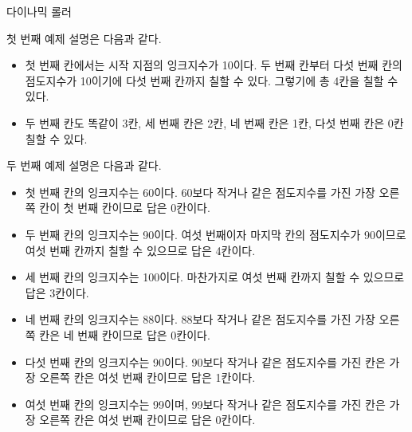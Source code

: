 \begin{problem}{다이나믹 롤러}
    \Examples
    
    \begin{example}
    \end{example}
    
    \Explanation
    첫 번째 예제 설명은 다음과 같다.
    \begin{itemize}
        \item 첫 번째 칸에서는 시작 지점의 잉크지수가 10이다. 두 번째 칸부터 다섯 번째 칸의 점도지수가 10이기에 다섯 번째 칸까지 칠할 수 있다. 그렇기에 총 4칸을 칠할 수 있다.
        \item 두 번째 칸도 똑같이 3칸, 세 번째 칸은 2칸, 네 번째 칸은 1칸, 다섯 번째 칸은 0칸 칠할 수 있다.
    \end{itemize}
    두 번째 예제 설명은 다음과 같다.
    \begin{itemize}
        \item 첫 번째 칸의 잉크지수는 60이다. 60보다 작거나 같은 점도지수를 가진 가장 오른쪽 칸이 첫 번째 칸이므로 답은 0칸이다.
        \item 두 번째 칸의 잉크지수는 90이다. 여섯 번째이자 마지막 칸의 점도지수가 90이므로 여섯 번째 칸까지 칠할 수 있으므로 답은 4칸이다.
        \item 세 번째 칸의 잉크지수는 100이다. 마찬가지로 여섯 번째 칸까지 칠할 수 있으므로 답은 3칸이다.
        \item 네 번째 칸의 잉크지수는 88이다. 88보다 작거나 같은 점도지수를 가진 가장 오른쪽 칸은 네 번째 칸이므로 답은 0칸이다.
        \item 다섯 번째 칸의 잉크지수는 90이다. 90보다 작거나 같은 점도지수를 가진 칸은 가장 오른쪽 칸은 여섯 번째 칸이므로 답은 1칸이다.
        \item 여섯 번째 칸의 잉크지수는 99이며, 99보다 작거나 같은 점도지수를 가진 칸은 가장 오른쪽 칸은 여섯 번째 칸이므로 답은 0칸이다.
    \end{itemize}
\end{problem}

